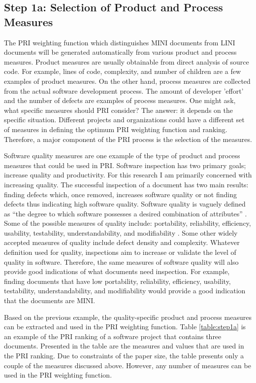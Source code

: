 \subsection{Step 1a: Selection of Product and Process Measures}
The PRI weighting function which distinguishes MINI documents from LINI
documents will be generated automatically from various product and process
measures. Product measures are usually obtainable from direct analysis of
source code.  For example, lines of code, complexity, and number of
children are a few examples of product measures. On the other hand, process
measures are collected from the actual software development process. The
amount of developer 'effort' and the number of defects are examples of
process measures. One might ask, what specific measures should PRI
consider? The answer: it depends on the specific situation. Different
projects and organizations could have a different set of measures in
defining the optimum PRI weighting function and ranking. Therefore, a major
component of the PRI process is the selection of the measures.

Software quality measures are one example of the type of product and
process measures that could be used in PRI. Software inspection has two
primary goals; increase quality and productivity. For this research I am
primarily concerned with increasing quality. The successful inspection of a
document has two main results: finding defects which, once removed,
increases software quality or not finding defects thus indicating high
software quality. Software quality is vaguely defined as ``the degree to
which software possesses a desired combination of attributes''
\cite{IEEEGlossary83}. Some of the possible measures of quality include:
portability, reliability, efficiency, usability, testability,
understandability, and modifiability \cite{Glass03}. Some other widely
accepted measures of quality include defect density and complexity.
Whatever definition used for quality, inspections aim to increase or
validate the level of quality in software.  Therefore, the same measures of
software quality will also provide good indications of what documents need
inspection. For example, finding documents that have low portability,
reliability, efficiency, usability, testability, understandability, and
modifiability would provide a good indication that the documents are MINI.

Based on the previous example, the quality-specific product and process
measures can be extracted and used in the PRI weighting function. Table
\ref{table:step1a} is an example of the PRI ranking of a software project
that contains three documents.  Presented in the table are the measures and
values that are used in the PRI ranking. Due to constraints of the paper
size, the table presents only a couple of the measures discussed above.
However, any number of measures can be used in the PRI weighting function.

